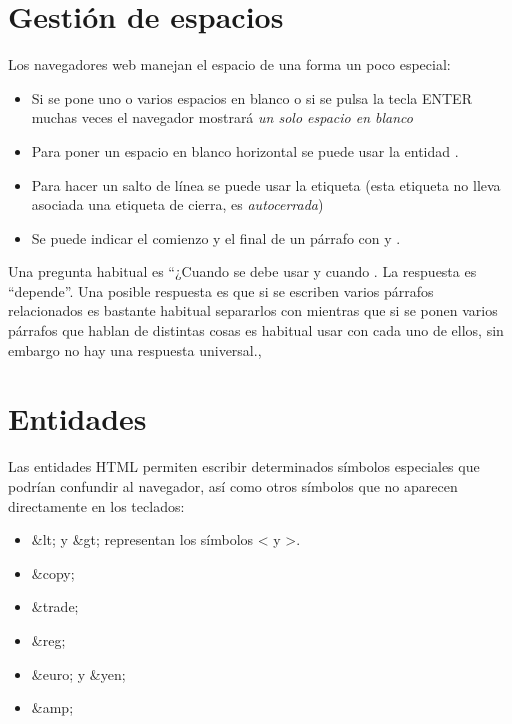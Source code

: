 \documentclass[letterpaper,10pt,spanish]{sphinxmanual}
\begin{document}
\section{Gestión de espacios}
\label{tema2:gestion-de-espacios}
Los navegadores web manejan el espacio de una forma un poco especial:
\begin{itemize}
\item {} 
Si se pone uno o varios espacios en blanco o si se pulsa la tecla ENTER muchas veces el navegador mostrará \emph{un solo espacio en blanco}

\item {} 
Para poner un espacio en blanco horizontal se puede usar la entidad .

\item {} 
Para hacer un salto de línea se puede usar la etiqueta  (esta etiqueta no lleva asociada una etiqueta de cierra, es \emph{autocerrada})

\item {} 
Se puede indicar el comienzo y el final de un párrafo con  y .

\end{itemize}

Una pregunta habitual es ``¿Cuando se debe usar  y cuando . La respuesta es ``depende''. Una posible respuesta es que si se escriben varios párrafos relacionados es bastante habitual separarlos con  mientras que si se ponen varios párrafos que hablan de distintas cosas es habitual usar  con cada uno de ellos, sin embargo no hay una respuesta universal.,


\section{Entidades}
\label{tema2:entidades}
Las entidades HTML permiten escribir determinados símbolos especiales que podrían confundir al navegador, así como otros símbolos que no aparecen directamente en los teclados:
\begin{itemize}
\item {} 
\&lt; y \&gt; representan los símbolos \textless{} y \textgreater{}.

\item {} 
\&copy;

\item {} 
\&trade;

\item {} 
\&reg;

\item {} 
\&euro; y \&yen;

\item {} 
\&amp;

\end{itemize}
\end{document}
